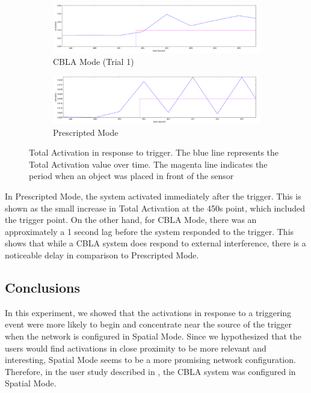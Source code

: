 \begin{figure}[!htb]
	\centering
	\begin{subfigure}[t]{0.9\textwidth}
		\centering
		\includegraphics[width=1.0 \textwidth]{"fig/validations/CBLA_responsiveness_c"}
		\caption{CBLA Mode (Trial 1)}
		\label{fig:response_plot_cbla}
	\end{subfigure}
	
	\begin{subfigure}[t]{0.9\textwidth}
		\centering
		\includegraphics[width=1.0 \textwidth]{"fig/validations/Prescripted_responsiveness_c"}
		\caption{Prescripted Mode}
		\label{fig:response_plot_prescripted}
	\end{subfigure}
	\caption[Total Activation in response to trigger plots]{Total Activation in response to trigger. The blue line represents the Total Activation value over time. The magenta line indicates the period when an object was placed in front of the sensor}
	\label{fig:Response_to_trigger_plot}
\end{figure}

In Prescripted Mode, the system activated immediately after the trigger. This is shown as the small increase in Total Activation at the 450s point, which included the trigger point. On the other hand, for CBLA Mode, there was an approximately a 1 second lag before the system responded to the trigger. This shows that while a CBLA system does respond to external interference, there is a noticeable delay in comparison to Prescripted Mode. 

\subsection{Conclusions}

In this experiment, we showed that the activations in response to a triggering event were more likely to begin and concentrate near the source of the trigger when the network is configured in Spatial Mode. Since we hypothesized that the users would find activations in close proximity to be more relevant and interesting, Spatial Mode seems to be a more promising network configuration. Therefore, in the user study described in , the CBLA system was configured in Spatial Mode. 

